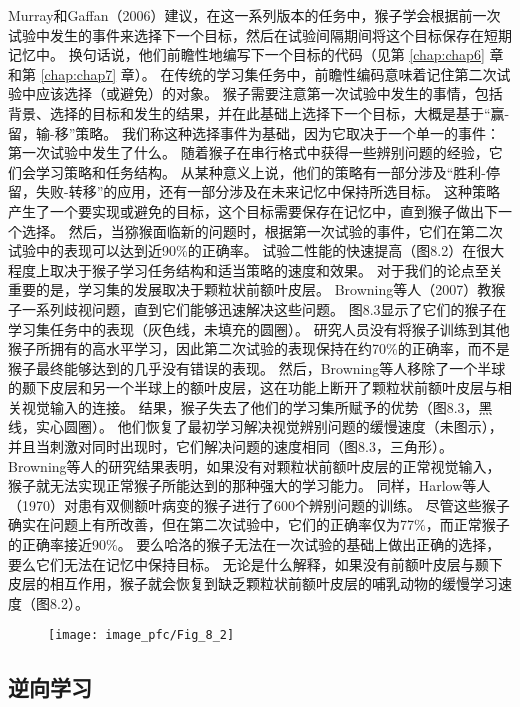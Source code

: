 Murray和Gaffan（2006）建议，在这一系列版本的任务中，猴子学会根据前一次试验中发生的事件来选择下一个目标，然后在试验间隔期间将这个目标保存在短期记忆中。
换句话说，他们前瞻性地编写下一个目标的代码（见第 \ref{chap:chap6} 章和第 \ref{chap:chap7} 章）。
在传统的学习集任务中，前瞻性编码意味着记住第二次试验中应该选择（或避免）的对象。
猴子需要注意第一次试验中发生的事情，包括背景、选择的目标和发生的结果，并在此基础上选择下一个目标，大概是基于“赢-留，输-移”策略。
我们称这种选择事件为基础，因为它取决于一个单一的事件：第一次试验中发生了什么。
随着猴子在串行格式中获得一些辨别问题的经验，它们会学习策略和任务结构。
从某种意义上说，他们的策略有一部分涉及“胜利-停留，失败-转移”的应用，还有一部分涉及在未来记忆中保持所选目标。
这种策略产生了一个要实现或避免的目标，这个目标需要保存在记忆中，直到猴子做出下一个选择。
然后，当猕猴面临新的问题时，根据第一次试验的事件，它们在第二次试验中的表现可以达到近90$\%$的正确率。
试验二性能的快速提高（图8.2）在很大程度上取决于猴子学习任务结构和适当策略的速度和效果。
对于我们的论点至关重要的是，学习集的发展取决于颗粒状前额叶皮层。
Browning等人（2007）教猴子一系列歧视问题，直到它们能够迅速解决这些问题。
图8.3显示了它们的猴子在学习集任务中的表现（灰色线，未填充的圆圈）。
研究人员没有将猴子训练到其他猴子所拥有的高水平学习，因此第二次试验的表现保持在约70$\%$的正确率，而不是猴子最终能够达到的几乎没有错误的表现。
然后，Browning等人移除了一个半球的颞下皮层和另一个半球上的额叶皮层，这在功能上断开了颗粒状前额叶皮层与相关视觉输入的连接。
结果，猴子失去了他们的学习集所赋予的优势（图8.3，黑线，实心圆圈）。
他们恢复了最初学习解决视觉辨别问题的缓慢速度（未图示），并且当刺激对同时出现时，它们解决问题的速度相同（图8.3，三角形）。
Browning等人的研究结果表明，如果没有对颗粒状前额叶皮层的正常视觉输入，猴子就无法实现正常猴子所能达到的那种强大的学习能力。
同样，Harlow等人（1970）对患有双侧额叶病变的猴子进行了600个辨别问题的训练。
尽管这些猴子确实在问题上有所改善，但在第二次试验中，它们的正确率仅为77$\%$，而正常猴子的正确率接近90$\%$。
要么哈洛的猴子无法在一次试验的基础上做出正确的选择，要么它们无法在记忆中保持目标。
无论是什么解释，如果没有前额叶皮层与颞下皮层的相互作用，猴子就会恢复到缺乏颗粒状前额叶皮层的哺乳动物的缓慢学习速度（图8.2）。

\begin{figure} 
	\centering
	\texttt{[image: image\_pfc/Fig\_8\_2]}
	\caption{ \label{fig:8_2}}
\end{figure}



\subsection{逆向学习}



